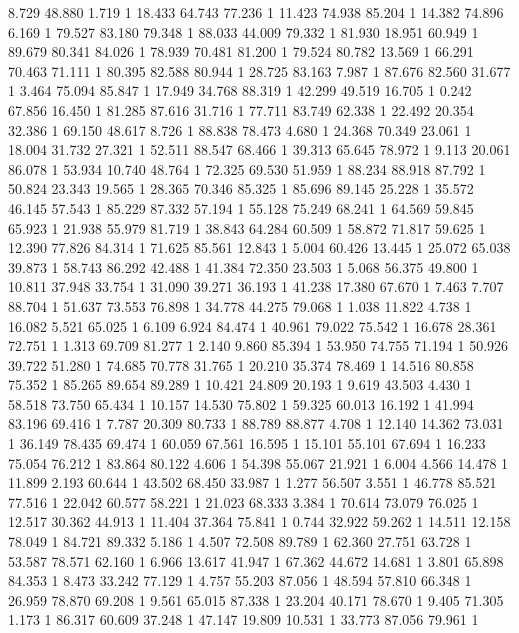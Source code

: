 	8.729	48.880	1.719	1
	18.433	64.743	77.236	1
	11.423	74.938	85.204	1
	14.382	74.896	6.169	1
	79.527	83.180	79.348	1
	88.033	44.009	79.332	1
	81.930	18.951	60.949	1
	89.679	80.341	84.026	1
	78.939	70.481	81.200	1
	79.524	80.782	13.569	1
	66.291	70.463	71.111	1
	80.395	82.588	80.944	1
	28.725	83.163	7.987	1
	87.676	82.560	31.677	1
	3.464	75.094	85.847	1
	17.949	34.768	88.319	1
	42.299	49.519	16.705	1
	0.242	67.856	16.450	1
	81.285	87.616	31.716	1
	77.711	83.749	62.338	1
	22.492	20.354	32.386	1
	69.150	48.617	8.726	1
	88.838	78.473	4.680	1
	24.368	70.349	23.061	1
	18.004	31.732	27.321	1
	52.511	88.547	68.466	1
	39.313	65.645	78.972	1
	9.113	20.061	86.078	1
	53.934	10.740	48.764	1
	72.325	69.530	51.959	1
	88.234	88.918	87.792	1
	50.824	23.343	19.565	1
	28.365	70.346	85.325	1
	85.696	89.145	25.228	1
	35.572	46.145	57.543	1
	85.229	87.332	57.194	1
	55.128	75.249	68.241	1
	64.569	59.845	65.923	1
	21.938	55.979	81.719	1
	38.843	64.284	60.509	1
	58.872	71.817	59.625	1
	12.390	77.826	84.314	1
	71.625	85.561	12.843	1
	5.004	60.426	13.445	1
	25.072	65.038	39.873	1
	58.743	86.292	42.488	1
	41.384	72.350	23.503	1
	5.068	56.375	49.800	1
	10.811	37.948	33.754	1
	31.090	39.271	36.193	1
	41.238	17.380	67.670	1
	7.463	7.707	88.704	1
	51.637	73.553	76.898	1
	34.778	44.275	79.068	1
	1.038	11.822	4.738	1
	16.082	5.521	65.025	1
	6.109	6.924	84.474	1
	40.961	79.022	75.542	1
	16.678	28.361	72.751	1
	1.313	69.709	81.277	1
	2.140	9.860	85.394	1
	53.950	74.755	71.194	1
	50.926	39.722	51.280	1
	74.685	70.778	31.765	1
	20.210	35.374	78.469	1
	14.516	80.858	75.352	1
	85.265	89.654	89.289	1
	10.421	24.809	20.193	1
	9.619	43.503	4.430	1
	58.518	73.750	65.434	1
	10.157	14.530	75.802	1
	59.325	60.013	16.192	1
	41.994	83.196	69.416	1
	7.787	20.309	80.733	1
	88.789	88.877	4.708	1
	12.140	14.362	73.031	1
	36.149	78.435	69.474	1
	60.059	67.561	16.595	1
	15.101	55.101	67.694	1
	16.233	75.054	76.212	1
	83.864	80.122	4.606	1
	54.398	55.067	21.921	1
	6.004	4.566	14.478	1
	11.899	2.193	60.644	1
	43.502	68.450	33.987	1
	1.277	56.507	3.551	1
	46.778	85.521	77.516	1
	22.042	60.577	58.221	1
	21.023	68.333	3.384	1
	70.614	73.079	76.025	1
	12.517	30.362	44.913	1
	11.404	37.364	75.841	1
	0.744	32.922	59.262	1
	14.511	12.158	78.049	1
	84.721	89.332	5.186	1
	4.507	72.508	89.789	1
	62.360	27.751	63.728	1
	53.587	78.571	62.160	1
	6.966	13.617	41.947	1
	67.362	44.672	14.681	1
	3.801	65.898	84.353	1
	8.473	33.242	77.129	1
	4.757	55.203	87.056	1
	48.594	57.810	66.348	1
	26.959	78.870	69.208	1
	9.561	65.015	87.338	1
	23.204	40.171	78.670	1
	9.405	71.305	1.173	1
	86.317	60.609	37.248	1
	47.147	19.809	10.531	1
	33.773	87.056	79.961	1
